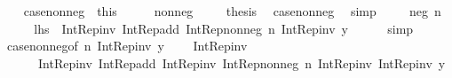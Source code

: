 \begin{isabellebody}
\isanewline
\ \ \isamarkupfalse%
\ case{\isacharunderscore}{\kern0pt}nonneg\ {\isacharequal}{\kern0pt}\ this\isanewline
\ \ \isacommand{{\isacharbraceleft}{\kern0pt}}\isamarkupfalse%
\ \isamarkupfalse%
\ {\isacharparenleft}{\kern0pt}nonneg\ {\isacharunderscore}{\kern0pt}{\isacharparenright}{\kern0pt}\ \isamarkupfalse%
\ \isamarkupfalse%
\ {\isacharquery}{\kern0pt}thesis\ \isamarkupfalse%
\ case{\isacharunderscore}{\kern0pt}nonneg\ \isamarkupfalse%
\ simp\ \isacommand{{\isacharbraceright}{\kern0pt}}\isamarkupfalse%
\isanewline
\ \ \isamarkupfalse%
\ {\isacharparenleft}{\kern0pt}neg\ n{\isacharparenright}{\kern0pt}\isanewline
\ \ \isamarkupfalse%
\ \isamarkupfalse%
\ {\isachardoublequoteopen}{\isacharquery}{\kern0pt}lhs\ {\isacharequal}{\kern0pt}\ Int{\isacharunderscore}{\kern0pt}Rep{\isacharunderscore}{\kern0pt}inv\ {\isacharparenleft}{\kern0pt}Int{\isacharunderscore}{\kern0pt}Rep{\isacharunderscore}{\kern0pt}add\ {\isacharparenleft}{\kern0pt}Int{\isacharunderscore}{\kern0pt}Rep{\isacharunderscore}{\kern0pt}nonneg\ n{\isacharparenright}{\kern0pt}\ {\isacharparenleft}{\kern0pt}Int{\isacharunderscore}{\kern0pt}Rep{\isacharunderscore}{\kern0pt}inv\ y{\isacharparenright}{\kern0pt}{\isacharparenright}{\kern0pt}{\isachardoublequoteclose}\isanewline
\ \ \ \ \isamarkupfalse%
\ simp\isanewline
\ \ \isamarkupfalse%
\ \isamarkupfalse%
\ case{\isacharunderscore}{\kern0pt}nonneg{\isacharbrackleft}{\kern0pt}of\ {\isachardoublequoteopen}n{\isachardoublequoteclose}\ {\isachardoublequoteopen}Int{\isacharunderscore}{\kern0pt}Rep{\isacharunderscore}{\kern0pt}inv\ y{\isachardoublequoteclose}{\isacharbrackright}{\kern0pt}\ \isamarkupfalse%
\ {\isachardoublequoteopen}{\isachardot}{\kern0pt}{\isachardot}{\kern0pt}{\isachardot}{\kern0pt}\ {\isacharequal}{\kern0pt}\ Int{\isacharunderscore}{\kern0pt}Rep{\isacharunderscore}{\kern0pt}inv\ {\isacharparenleft}{\kern0pt}\isanewline
\ \ \ \ \ \ Int{\isacharunderscore}{\kern0pt}Rep{\isacharunderscore}{\kern0pt}inv\ {\isacharparenleft}{\kern0pt}Int{\isacharunderscore}{\kern0pt}Rep{\isacharunderscore}{\kern0pt}add\ {\isacharparenleft}{\kern0pt}Int{\isacharunderscore}{\kern0pt}Rep{\isacharunderscore}{\kern0pt}inv\ {\isacharparenleft}{\kern0pt}Int{\isacharunderscore}{\kern0pt}Rep{\isacharunderscore}{\kern0pt}nonneg\ n{\isacharparenright}{\kern0pt}{\isacharparenright}{\kern0pt}\ {\isacharparenleft}{\kern0pt}Int{\isacharunderscore}{\kern0pt}Rep{\isacharunderscore}{\kern0pt}inv\ {\isacharparenleft}{\kern0pt}Int{\isacharunderscore}{\kern0pt}Rep{\isacharunderscore}{\kern0pt}inv\ y{\isacharparenright}{\kern0pt}{\isacharparenright}{\kern0pt}{\isacharparenright}{\kern0pt}\isanewline

\end{isabellebody}
